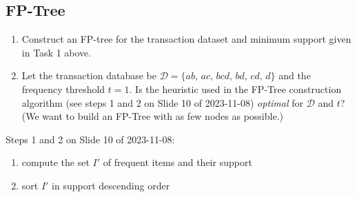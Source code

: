 \documentclass{article}
\begin{document}
  \subsection{FP-Tree}
  \begin{centerframebox}
    \begin{enumerate}[label=(\roman*)]
      \item Construct an FP-tree for the transaction dataset and minimum support
      given in Task 1 above.
      \item  Let the transaction database be $\mathcal{D} = \{ab,\, ac,\, bcd,\, bd,\, cd,\, d\}$ and the frequency threshold $t = 1$.
      Is the heuristic used in the FP-Tree construction algorithm (see steps 1 and 2 on Slide 10 of 2023-11-08)
      \textit{optimal} for $\mathcal{D}$ and $t$? (We want to build an FP-Tree with as few nodes as possible.)
    \end{enumerate}

    Steps 1 and 2 on Slide 10 of 2023-11-08:
    \begin{enumerate}[label=\arabic*:]
      \item compute the set $I'$ of frequent items and their support
      \item sort $I'$ in support descending order
    \end{enumerate}
  \end{centerframebox}
\end{document}
